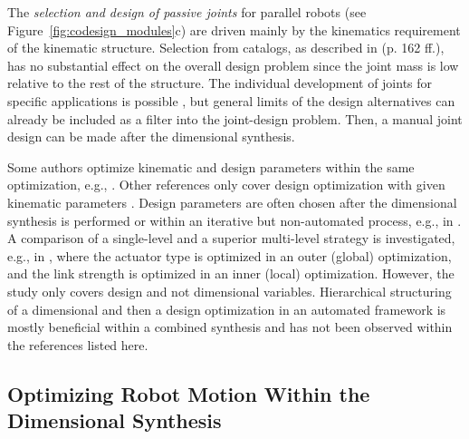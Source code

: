 The \emph{selection and design of passive joints} for parallel robots (see Figure~\ref{fig:codesign_modules}c) are driven mainly by the kinematics requirement of the kinematic structure.
Selection from catalogs, as described in \cite{Neugebauer2006} (p. 162 ff.), has no substantial effect on the overall design problem since the joint mass is low relative to the rest of the structure.
The individual development of joints for specific applications is possible \cite{Otremba2005,SterneckFetSch2023}, but general limits of the design alternatives can already be included as a filter into the joint-design problem.
Then, a manual joint design can be made after the dimensional synthesis.

%
%
%
%
%
%
%
%
%
%
%
%
%
%
%
%
%
%
%
%
%
%
%
%

%


%
%
%
%
%
%
%

%
%
%
%

%

%
%

%
%
%
%

Some authors optimize kinematic and design parameters within the same optimization, e.g., \cite{ZhouBai2015,Prause2016,WangZhaCheHua2017}.
Other references only cover design optimization with given kinematic parameters \cite{PetterssonOel2009,TarkianPerOelFen2011}.
Design parameters are often chosen after the dimensional synthesis is performed or within an iterative but non-automated process, e.g., in \cite{VulliezZegKha2018}.
A comparison of a single-level and a superior multi-level strategy is investigated, e.g., in \cite{TarkianPerOelFen2011}, where the actuator type is optimized in an outer (global) optimization, and the link strength is optimized in an inner (local) optimization.
However, the study only covers design and not dimensional variables.
Hierarchical structuring of a dimensional and then a design optimization in an automated framework is mostly beneficial within a combined synthesis and has not been observed within the references listed here.


%



\subsection{Optimizing Robot Motion Within the Dimensional Synthesis} %
\label{sec:ds_soa_motionplanning}

